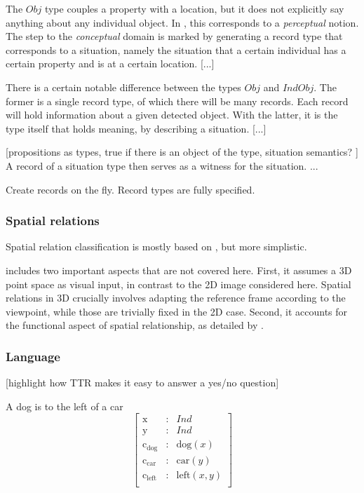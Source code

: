 \documentclass[11pt, a4paper]{article}
\begin{document}
The $Obj$ type couples a property with a location, but it does not explicitly say anything about any individual object.
In \cite{lspc}, this corresponds to a \textit{perceptual} notion.
The step to the \textit{conceptual} domain is marked by generating a record type that corresponds to a situation, namely the situation that a certain individual has a certain property and is at a certain location.
[...]

There is a certain notable difference between the types $Obj$ and $IndObj$.
The former is a single record type, of which there will be many records.
Each record will hold information about a given detected object.
With the latter, it is the type itself that holds meaning, by describing a situation.
[...]

[propositions as types, true if there is an object of the type, situation semantics? \cite{BarwiseSituationsAttitudes1981}]
A record of a situation type then serves as a witness for the situation.
...

Create records on the fly.
Record types are fully specified.



\subsubsection{Spatial relations}

Spatial relation classification is mostly based on \cite{ttrspat}, but more simplistic.

\cite{ttrspat} includes two important aspects that are not covered here.
First, it assumes a 3D point space as visual input, in contrast to the 2D image considered here.
Spatial relations in 3D crucially involves adapting the reference frame according to the viewpoint, while those are trivially fixed in the 2D case.
Second, it accounts for the functional aspect of spatial relationship, as detailed by \cite{CoventryClassificationExtrageometricInfluences2004}.




\subsubsection{Language}

[highlight how TTR makes it easy to answer a yes/no question]

A dog is to the left of a car
\begin{equation}\left[\begin{array}{rcl}
\text{x} &:& Ind\\
\text{y} &:& Ind\\
\text{c}_\text{dog} &:& \text{dog}(x)\\
\text{c}_\text{car} &:& \text{car}(y)\\
\text{c}_\text{left} &:& \text{left}(x, y)\\
\end{array}\right]\end{equation}
\end{document}
